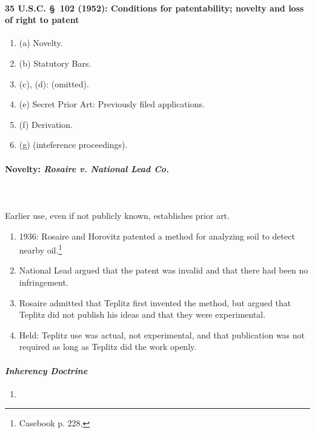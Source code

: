 \paragraph{35 U.S.C. \S\ 102 (1952): Conditions for patentability; novelty and 
loss of right to patent}

\begin{enumerate}
    \item (a) Novelty.
    \item (b) Statutory Bars.
    \item (c), (d): (omitted).
    \item (e) Secret Prior Art: Previously filed applications.
    \item (f) Derivation.
    \item (g) (inteference proceedings).
\end{enumerate}

\paragraph{Novelty: \emph{Rosaire v. National Lead Co.}}
~\\\\
Earlier use, even if not publicly known, establishes prior art.

\begin{enumerate}
    \item 1936: Rosaire and Horovitz patented a method for analyzing soil to 
    detect nearby oil.\footnote{Casebook p. 228.}
    \item National Lead argued that the patent was invalid and that there had 
    been no infringement.
    \item Rosaire admitted that Teplitz first invented the method, but argued 
    that Teplitz did not publish his ideas and that they were experimental.
    \item Held: Teplitz use was actual, not experimental, and that publication 
    was not required as long as Teplitz did the work openly.
\end{enumerate}

\paragraph{\emph{Inherency Doctrine}} %

\begin{enumerate}
    \item 
\end{enumerate}

